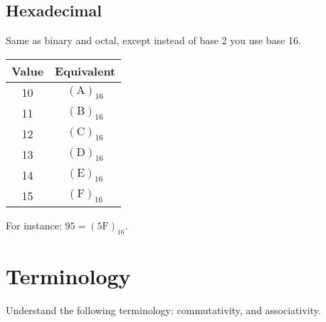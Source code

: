 \subsection{Hexadecimal}

Same as binary and octal, except instead of base 2 you use base 16.

\begin{tabular}{c c}
  \hline
  Value & Equivalent \\
  \hline
  10 & $(\text{A})_{16}$ \\
  11 & $(\text{B})_{16}$ \\
  12 & $(\text{C})_{16}$ \\
  13 & $(\text{D})_{16}$ \\
  14 & $(\text{E})_{16}$ \\
  15 & $(\text{F})_{16}$ \\
\end{tabular}

For instance: $95 = (5\text{F})_{16}$.

\section{Terminology}

Understand the following terminology: commutativity, and associativity.
